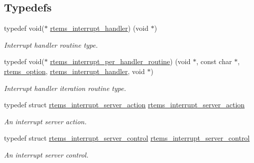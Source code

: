 \subsection*{Typedefs}
\begin{DoxyCompactItemize}
\item 
typedef void($\ast$ \mbox{\hyperlink{group__rtems__interrupt__extension_gab39bd096ab2c3b41d03dace0e9777b08}{rtems\+\_\+interrupt\+\_\+handler}}) (void $\ast$)
\begin{DoxyCompactList}\small\item\em Interrupt handler routine type. \end{DoxyCompactList}\item 
typedef void($\ast$ \mbox{\hyperlink{group__rtems__interrupt__extension_gad3e88a9acfac97a5021ff98471f5cd71}{rtems\+\_\+interrupt\+\_\+per\+\_\+handler\+\_\+routine}}) (void $\ast$, const char $\ast$, \mbox{\hyperlink{group__ClassicOptions_gad26685eb0e60a9650082935c31920e29}{rtems\+\_\+option}}, \mbox{\hyperlink{group__rtems__interrupt__extension_gab39bd096ab2c3b41d03dace0e9777b08}{rtems\+\_\+interrupt\+\_\+handler}}, void $\ast$)
\begin{DoxyCompactList}\small\item\em Interrupt handler iteration routine type. \end{DoxyCompactList}\item 
typedef struct \mbox{\hyperlink{structrtems__interrupt__server__action}{rtems\+\_\+interrupt\+\_\+server\+\_\+action}} \mbox{\hyperlink{group__rtems__interrupt__extension_ga0349931ca47898d7b89ff3ee09dee2cc}{rtems\+\_\+interrupt\+\_\+server\+\_\+action}}
\begin{DoxyCompactList}\small\item\em An interrupt server action. \end{DoxyCompactList}\item 
typedef struct \mbox{\hyperlink{structrtems__interrupt__server__control}{rtems\+\_\+interrupt\+\_\+server\+\_\+control}} \mbox{\hyperlink{group__rtems__interrupt__extension_ga25f7b3fd5fce7a851fe2f12f8943a0ff}{rtems\+\_\+interrupt\+\_\+server\+\_\+control}}
\begin{DoxyCompactList}\small\item\em An interrupt server control. \end{DoxyCompactList}\end{DoxyCompactItemize}
